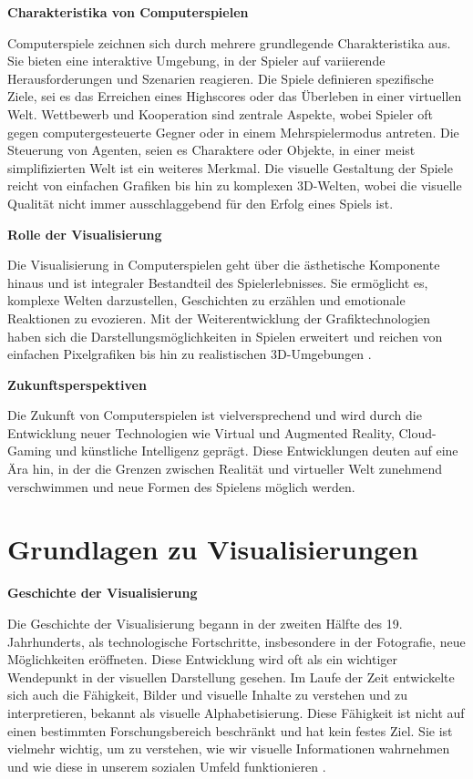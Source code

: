\textbf{Charakteristika von Computerspielen}

Computerspiele zeichnen sich durch mehrere grundlegende Charakteristika aus. Sie bieten eine interaktive Umgebung, in der Spieler auf variierende Herausforderungen und Szenarien reagieren. Die Spiele definieren spezifische Ziele, sei es das Erreichen eines Highscores oder das Überleben in einer virtuellen Welt. Wettbewerb und Kooperation sind zentrale Aspekte, wobei Spieler oft gegen computergesteuerte Gegner oder in einem Mehrspielermodus antreten. Die Steuerung von Agenten, seien es Charaktere oder Objekte, in einer meist simplifizierten Welt ist ein weiteres Merkmal. Die visuelle Gestaltung der Spiele reicht von einfachen Grafiken bis hin zu komplexen 3D-Welten, wobei die visuelle Qualität nicht immer ausschlaggebend für den Erfolg eines Spiels ist.

\textbf{Rolle der Visualisierung}

Die Visualisierung in Computerspielen geht über die ästhetische Komponente hinaus und ist integraler Bestandteil des Spielerlebnisses. Sie ermöglicht es, komplexe Welten darzustellen, Geschichten zu erzählen und emotionale Reaktionen zu evozieren. Mit der Weiterentwicklung der Grafiktechnologien haben sich die Darstellungsmöglichkeiten in Spielen erweitert und reichen von einfachen Pixelgrafiken bis hin zu realistischen 3D-Umgebungen \cite{COMP}.

\textbf{Zukunftsperspektiven}

Die Zukunft von Computerspielen ist vielversprechend und wird durch die Entwicklung neuer Technologien wie Virtual und Augmented Reality, Cloud-Gaming und künstliche Intelligenz geprägt. Diese Entwicklungen deuten auf eine Ära hin, in der die Grenzen zwischen Realität und virtueller Welt zunehmend verschwimmen und neue Formen des Spielens möglich werden.


\section{Grundlagen zu Visualisierungen}

\textbf{Geschichte der Visualisierung}

Die Geschichte der Visualisierung begann in der zweiten Hälfte des 19. Jahrhunderts, als technologische Fortschritte, insbesondere in der Fotografie, neue Möglichkeiten eröffneten. Diese Entwicklung wird oft als ein wichtiger Wendepunkt in der visuellen Darstellung gesehen. Im Laufe der Zeit entwickelte sich auch die Fähigkeit, Bilder und visuelle Inhalte zu verstehen und zu interpretieren, bekannt als visuelle Alphabetisierung. Diese Fähigkeit ist nicht auf einen bestimmten Forschungsbereich beschränkt und hat kein festes Ziel. Sie ist vielmehr wichtig, um zu verstehen, wie wir visuelle Informationen wahrnehmen und wie diese in unserem sozialen Umfeld funktionieren \cite{Simunek2009}.

